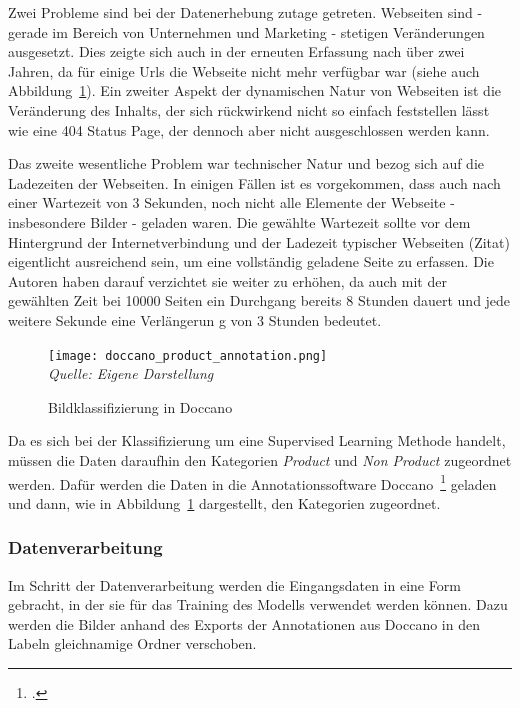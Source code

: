 Zwei Probleme sind bei der Datenerhebung zutage getreten.
Webseiten sind - gerade im Bereich von Unternehmen und Marketing - stetigen Veränderungen ausgesetzt. Dies zeigte sich auch in der erneuten Erfassung nach über zwei Jahren, da für einige Urls die Webseite nicht mehr verfügbar war (siehe auch Abbildung~\ref{fig:doccano_products}).
Ein zweiter Aspekt der dynamischen Natur von Webseiten ist die Veränderung des Inhalts, der sich rückwirkend nicht so einfach feststellen lässt wie eine 404 Status Page, der dennoch aber nicht ausgeschlossen werden kann.

Das zweite wesentliche Problem war technischer Natur und bezog sich auf die Ladezeiten der Webseiten. In einigen Fällen ist es vorgekommen, dass auch nach einer Wartezeit von 3 Sekunden, noch nicht alle Elemente der Webseite - insbesondere Bilder - geladen waren.
Die gewählte Wartezeit sollte vor dem Hintergrund der Internetverbindung und der Ladezeit typischer Webseiten (Zitat) eigentlicht ausreichend sein, um eine vollständig geladene Seite zu erfassen.
Die Autoren haben darauf verzichtet sie weiter zu erhöhen, da auch mit der gewählten Zeit bei 10000 Seiten ein Durchgang bereits 8 Stunden dauert und jede weitere Sekunde eine Verlängerun g von 3 Stunden bedeutet.

\begin{figure}[H]
    \centering
    \caption[]{Bildklassifizierung in Doccano}
	\label{fig:doccano_products}
    \texttt{[image: doccano\_product\_annotation.png]}
	\\
	\textit{Quelle: Eigene Darstellung}
\end{figure}
Da es sich bei der Klassifizierung um eine Supervised Learning Methode handelt, müssen die Daten daraufhin den Kategorien \textit{Product} und \textit{Non Product} zugeordnet werden.
Dafür werden die Daten in die Annotationssoftware Doccano~\footcite[\vglf][]{doccano-2018} geladen und dann, wie in Abbildung~\ref{fig:doccano_products} dargestellt, den Kategorien zugeordnet.

\subsubsection{Datenverarbeitung}\label{subsubsec_class_datenverarbeitung}
Im Schritt der Datenverarbeitung werden die Eingangsdaten in eine Form gebracht, in der sie für das Training des Modells verwendet werden können.
Dazu werden die Bilder anhand des Exports der Annotationen aus Doccano in den Labeln gleichnamige Ordner verschoben.

